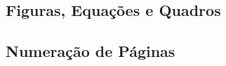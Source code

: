 \documentclass[9pt,a4paper]{extarticle}
\begin{document}
\begin{multicols}{2}

\subsection{Figuras, Equações e Quadros}







\subsection{Numeração de Páginas}\label{sec:number}



\end{multicols}
\end{document}
